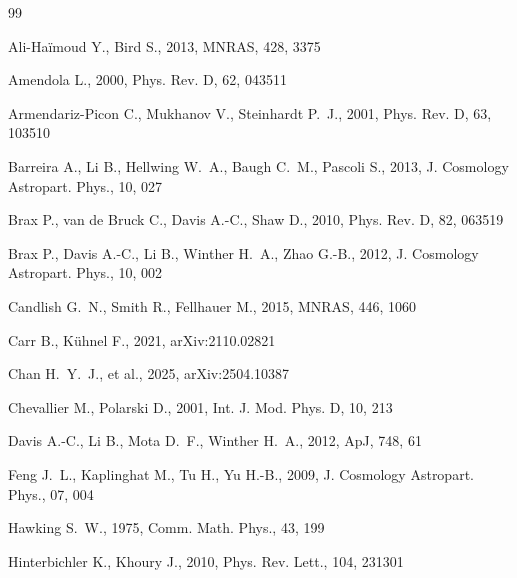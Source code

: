 \documentclass[11pt,a4paper]{article}
\begin{document}
\begin{thebibliography}{99}

Ali-Ha\"imoud Y., Bird S., 2013, MNRAS, 428, 3375

Amendola L., 2000, Phys. Rev. D, 62, 043511

Armendariz-Picon C., Mukhanov V., Steinhardt P.~J., 2001, Phys. Rev. D, 63, 103510

Barreira A., Li B., Hellwing W.~A., Baugh C.~M., Pascoli S., 2013, J. Cosmology Astropart. Phys., 10, 027

Brax P., van de Bruck C., Davis A.-C., Shaw D., 2010, Phys. Rev. D, 82, 063519

Brax P., Davis A.-C., Li B., Winther H.~A., Zhao G.-B., 2012, J. Cosmology Astropart. Phys., 10, 002

Candlish G.~N., Smith R., Fellhauer M., 2015, MNRAS, 446, 1060

Carr B., K\"uhnel F., 2021, arXiv:2110.02821

Chan H.~Y.~J., et al., 2025, arXiv:2504.10387

Chevallier M., Polarski D., 2001, Int. J. Mod. Phys. D, 10, 213

Davis A.-C., Li B., Mota D.~F., Winther H.~A., 2012, ApJ, 748, 61

Feng J.~L., Kaplinghat M., Tu H., Yu H.-B., 2009, J. Cosmology Astropart. Phys., 07, 004

Hawking S.~W., 1975, Comm. Math. Phys., 43, 199

Hinterbichler K., Khoury J., 2010, Phys. Rev. Lett., 104, 231301


\end{thebibliography}
\end{document}
